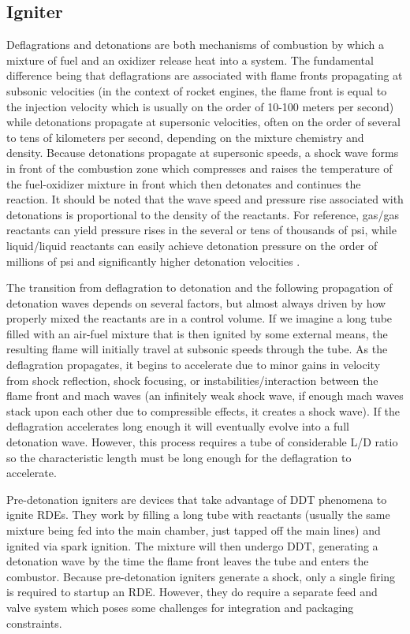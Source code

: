 \subsection{Igniter}

Deflagrations and detonations are both mechanisms of combustion by which a mixture of fuel and an oxidizer release heat into a system. The fundamental difference being that deflagrations are associated with flame fronts propagating at subsonic velocities (in the context of rocket engines, the flame front is equal to the injection velocity which is usually on the order of 10-100 meters per second) while detonations propagate at supersonic velocities, often on the order of several to tens of kilometers per second, depending on the mixture chemistry and density. Because detonations propagate at supersonic speeds, a shock wave forms in front of the combustion zone which compresses and raises the temperature of the fuel-oxidizer mixture in front which then detonates and continues the reaction. It should be noted that the wave speed and pressure rise associated with detonations is proportional to the density of the reactants. For reference, gas/gas reactants can yield pressure rises in the several or tens of thousands of psi, while liquid/liquid reactants can easily achieve detonation pressure on the order of millions of psi and significantly higher detonation velocities \cite{heister:2022}.

The transition from deflagration to detonation and the following propagation of detonation waves depends on several factors, but almost always driven by how properly mixed the reactants are in a control volume. If we imagine a long tube filled with an air-fuel mixture that is then ignited by some external means, the resulting flame will initially travel at subsonic speeds through the tube. As the deflagration propagates, it begins to accelerate due to minor gains in velocity from shock reflection, shock focusing, or instabilities/interaction between the flame front and mach waves \cite{breitung:2000} (an infinitely weak shock wave, if enough mach waves stack upon each other due to compressible effects, it creates a shock wave). If the deflagration accelerates long enough it will eventually evolve into a full detonation wave. However, this process requires a tube of considerable L/D ratio so the characteristic length must be long enough for the deflagration to accelerate.

Pre-detonation igniters are devices that take advantage of DDT phenomena to ignite RDEs. They work by filling a long tube with reactants (usually the same mixture being fed into the main chamber, just tapped off the main lines) and ignited via spark ignition. The mixture will then undergo DDT, generating a detonation wave by the time the flame front leaves the tube and enters the combustor. Because pre-detonation igniters generate a shock, only a single firing is required to startup an RDE. However, they do require a separate feed and valve system which poses some challenges for integration and packaging constraints.

